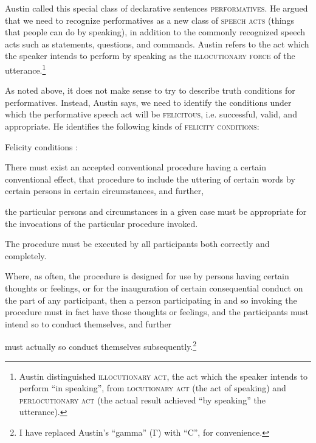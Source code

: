 Austin called this special class of declarative sentences \textsc{performatives}. He argued that we need to recognize performatives as a new class of \textsc{speech acts} (things that people can do by speaking), in addition to the commonly recognized speech acts such as statements, questions, and commands. Austin refers to the act which the speaker intends to perform by speaking as the \textsc{illocutionary force} of the utterance.\footnote{Austin distinguished \textsc{illocutionary act,} the act which the speaker intends to perform “in speaking”, from \textsc{locutionary act} (the act of speaking) and \textsc{perlocutionary act} (the actual result achieved “by speaking” the utterance).}



As noted above, it does not make sense to try to describe truth conditions for performatives. Instead, Austin says, we need to identify the conditions under which the performative speech act will be \textsc{felicitous}, i.e. successful, valid, and appropriate. He identifies the following kinds of \textsc{felicity conditions}:


\ea \label{ex:10.4}
Felicity conditions \citep[14--15]{Austin1962}:\\

\begin{xlist}[(A.2)]
   There must exist an accepted conventional procedure having a certain conventional effect, that procedure to include the uttering of certain words by certain persons in certain circumstances, and further,

   the particular persons and circumstances in a given case must be appropriate for the invocations of the particular procedure invoked.

  \medskip
   The procedure must be executed by all participants both correctly and 
   completely.
  
  \medskip  
   Where, as often, the procedure is designed for use by persons having certain thoughts or feelings, or for the inauguration of certain consequential conduct on the part of any participant, then a person participating in and so invoking the procedure must in fact have those thoughts or feelings, and the participants must intend so to conduct themselves, and further

   must actually so conduct themselves subsequently.\footnote{I have replaced Austin’s “gamma” (Γ) with “C”, for convenience.}
\end{xlist}
\z

